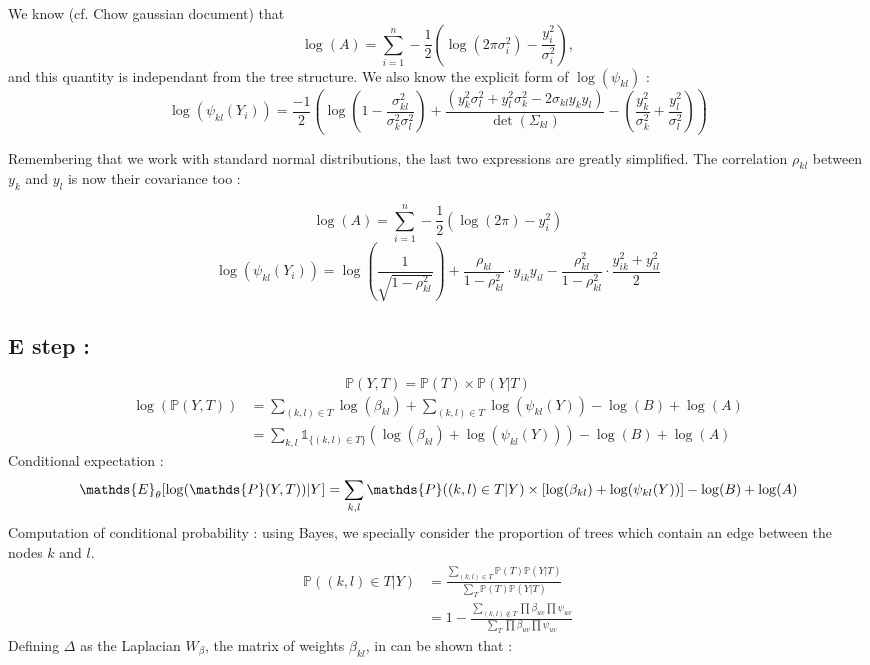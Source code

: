\documentclass[a4paper,10pt]{article}
\begin{document}
We know (cf. Chow gaussian document) that 
\[\log(A) = \sum_{i=1}^n-\frac{1}{2}\left(\log(2\pi\sigma_i^2)-\frac{y_i^2}{\sigma_i^2}\right),\]
and this quantity is independant from the tree structure. We also know the explicit form of $\log(\psi_{kl})$ :
\[\log(\psi_{kl}(Y_i))=\frac{-1}{2}\left(\log\left(1-\frac{\sigma_{kl}^2}{\sigma_k^2 \sigma_{l}^2}\right)+\frac{(y_k^2\sigma_{l}^2+y_{l}^2\sigma_k^2-2\sigma_{kl}y_ky_{l})}
{\det(\Sigma_{kl})}-\left(\frac{y_k^2}{\sigma_k^2}+\frac{y_{l}^2}{\sigma_{l}^2}\right)\right)\]

Remembering that we work with standard normal distributions, the last two expressions are greatly simplified. The correlation $\rho_{kl}$ 
between $y_k$ and $y_l$ is now their covariance too :

\[\log(A) = \sum_{i=1}^n-\frac{1}{2}\left(\log(2\pi)-y_i^2\right)\]
\[\log(\psi_{kl}(Y_i))=\log\left(\frac{1}{\sqrt{1-\rho_{kl}^2}}\right)+\frac{\rho_{kl}}{1-\rho_{kl}^2}\cdot y_{ik}y_{il} - 
\frac{\rho_{kl}^2}{1-\rho_{kl}^2}\cdot \frac{y_{ik}^2 + y_{il}^2}{2}\]

\subsection{E step :}
\[ \mathds{P}(Y,T) = \mathds{P}(T)\times\mathds{P}(Y|T)\]
\begin{align*}
 \log(\mathds{P}(Y,T)) &= \sum_{(k,l)\in T} \log(\beta_{kl})  + \sum_{(k,l)\in T} \log(\psi_{kl}(Y))- \log (B)+\log(A)\\
 &=\sum_{k,l} \mathds{1}_{\{(k,l) \in T\}} \left(\log(\beta_{kl})  +  \log(\psi_{kl}(Y))\right)- \log (B)+\log(A)
\end{align*}
 Conditional expectation :
\[ \mathds{E}_\theta[\log(\mathds{P}(Y,T))|Y] \\
= \sum_{k,l}  \mathds{P}((k,l)\in T | Y) \times \left[ \log(\beta_{kl}) + \log(\psi_{kl}(Y)) \right]
 -\log(B)+\log(A)\]
 Computation of conditional probability : using Bayes, we specially consider the proportion of trees which contain an edge between the nodes $k$ and $l$.
 \begin{align*}
 \mathds{P}((k,l)\in T | Y)  &= \frac{\sum_{(k,l)\in T} \mathds{P}(T)\mathds{P}(Y|T)}{\sum_{T} \mathds{P}(T)\mathds{P}(Y|T)}\\
 &=1-\frac{\sum_{(k,l)\notin T} \prod \beta_{uv} \prod \psi_{uv}}{\sum_{T} \prod \beta_{uv} \prod \psi_{uv}}
 \end{align*}
 Defining $\Delta$ as the Laplacian $W_{\beta}$, the matrix  of weights $\beta_{kl}$, in can be shown that :
\end{document}

